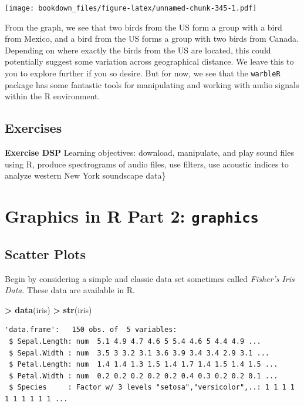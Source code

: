 \documentclass[
]{krantz}
\makeatletter
\newenvironment{Shaded}{\begin{snugshade}}{\end{snugshade}}
\newcommand{\KeywordTok}[1]{\textcolor[rgb]{0.27,0.27,0.27}{\textbf{#1}}}
\newcommand{\NormalTok}[1]{#1}
\newcommand{\OperatorTok}[1]{\textcolor[rgb]{0.43,0.43,0.43}{\textbf{#1}}}
\newcommand{\StringTok}[1]{\textcolor[rgb]{0.5,0.5,0.5}{#1}}
\newenvironment{kframe}{%
\medskip{}
\setlength{\fboxsep}{.8em}
 \def\at@end@of@kframe{}%
 \ifinner\ifhmode%
  \def\at@end@of@kframe{\end{minipage}}%
  \begin{minipage}{\columnwidth}%
 \fi\fi%
 \def\FrameCommand##1{\hskip\@totalleftmargin \hskip-\fboxsep
 \colorbox{shadecolor}{##1}\hskip-\fboxsep
     \hskip-\linewidth \hskip-\@totalleftmargin \hskip\columnwidth}%
 \MakeFramed {\advance\hsize-\width
   \@totalleftmargin\z@ \linewidth\hsize
   \@setminipage}}%
 {\par\unskip\endMakeFramed%
 \at@end@of@kframe}
\renewenvironment{Shaded}{\begin{kframe}}{\end{kframe}}
\makeatother
\begin{document}
\texttt{[image: bookdown\_files/figure-latex/unnamed-chunk-345-1.pdf]}

From the graph, we see that two birds from the US form a group with a bird from Mexico, and a bird from the US forms a group with two birds from Canada. Depending on where exactly the birds from the US are located, this could potentially suggest some variation across geographical distance. We leave this to you to explore further if you so desire. But for now, we see that the \texttt{warbleR} package has some fantastic tools for manipulating and working with audio signals within the R environment.

\hypertarget{exercises-11}{%
\section{Exercises}\label{exercises-11}}

\textbf{Exercise DSP} Learning objectives: download, manipulate, and play sound files using R, produce spectrograms of audio files, use filters, use acoustic indices to analyze western New York soundscape data\}

\hypertarget{graphics}{%
\chapter{\texorpdfstring{Graphics in R Part 2: \texttt{graphics}}{Graphics in R Part 2: graphics}}\label{graphics}}

\hypertarget{scatter-plots-1}{%
\section{Scatter Plots}\label{scatter-plots-1}}

Begin by considering a simple and classic data set sometimes called \emph{Fisher's Iris Data}. These data are available in R.

\begin{Shaded}
\begin{Highlighting}[]
\OperatorTok{\textgreater{}}\StringTok{ }\KeywordTok{data}\NormalTok{(iris)}
\OperatorTok{\textgreater{}}\StringTok{ }\KeywordTok{str}\NormalTok{(iris)}
\end{Highlighting}
\end{Shaded}

\begin{verbatim}
'data.frame':   150 obs. of  5 variables:
 $ Sepal.Length: num  5.1 4.9 4.7 4.6 5 5.4 4.6 5 4.4 4.9 ...
 $ Sepal.Width : num  3.5 3 3.2 3.1 3.6 3.9 3.4 3.4 2.9 3.1 ...
 $ Petal.Length: num  1.4 1.4 1.3 1.5 1.4 1.7 1.4 1.5 1.4 1.5 ...
 $ Petal.Width : num  0.2 0.2 0.2 0.2 0.2 0.4 0.3 0.2 0.2 0.1 ...
 $ Species     : Factor w/ 3 levels "setosa","versicolor",..: 1 1 1 1 1 1 1 1 1 1 ...
\end{verbatim}
\end{document}
